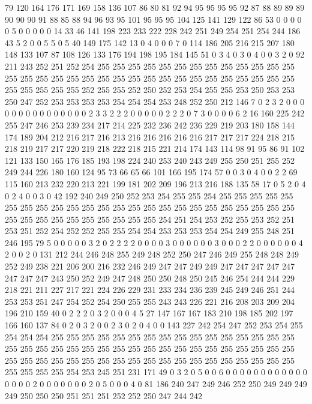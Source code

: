 79 120 164 176 171 169 158 136 107 86 80 81 92 94 95 95 95 95 92 87
88 89 89 89 90 90 90 91 88 85 88 94 96 93 95 101 95 95 95 104
125 141 129 122 86 53 0 0 0 0 0 5 0 0 0 0 0 14 33 46
141 198 223 233 222 228 242 251 249 254 251 254 244 186 43 5 2 0 0 5
5 0 5 40 149 175 142 13 0 4 0 0 0 7 0 114 186 205 216 215
207 180 148 133 107 87 108 126 133 176 194 198 195 184 145 51 0 3 4 0
3 0 4 0 0 3 2 0 92 211 243 252 251 252 254 255 255 255 255 255
255 255 255 255 255 255 255 255 255 255 255 255 255 255 255 255 255 255 255 255
255 255 255 255 255 255 255 255 255 255 255 255 252 255 255 252 250 252 253 254
255 255 253 250 253 253 250 247 252 253 253 253 253 254 254 254 253 248 252 250
212 146 7 0 2 3 2 0 0 0 0 0 0 0 0 0 0 0 0 0
0 0 2 3 3 2 2 2 0 0 0 0 0 2 2 2 0 7 3 0
0 0 0 6 2 16 160 225 242 255 247 246 253 239 234 217 214 225 232 236
242 236 229 219 203 180 158 144 174 189 204 212 216 217 216 213 216 216 216 216
216 217 217 217 224 218 215 218 219 217 217 220 219 218 222 218 215 221 214 174
143 114 98 91 95 86 91 102 121 133 150 165 176 185 193 198 224 240 253 240
243 249 255 250 251 255 252 249 244 226 180 160 124 95 73 66 65 66 101 166
195 174 57 0 0 3 0 4 0 0 2 2 69 115 160 213 232 220 213 221
199 181 202 209 196 213 216 188 135 58 17 0 5 2 0 4 0 2 4 0
0 3 0 42 192 240 249 250 252 253 254 255 255 254 255 255 255 255 255 255
255 255 255 255 255 255 255 255 255 255 255 255 255 255 255 255 255 255 255 255
255 255 255 255 255 255 255 255 254 251 254 253 252 255 253 252 251 253 251 252
254 252 252 255 255 254 254 253 253 253 254 254 249 255 248 251 246 195 79 5
0 0 0 0 0 3 2 0 2 2 2 2 0 0 0 0 3 0 0 0
0 0 0 3 0 0 0 2 2 0 0 0 0 0 0 4 2 0 0 2
0 131 212 244 246 248 255 249 248 252 250 247 246 249 255 248 248 249 252 249
238 221 206 200 216 232 246 249 247 247 249 249 247 247 247 247 247 247 247 247
243 250 252 249 247 248 250 250 248 250 245 246 254 244 244 229 218 221 211 227
217 221 224 226 229 231 233 234 236 239 245 249 246 251 244 253 253 251 247 254
252 254 250 255 255 243 243 226 221 216 208 203 209 204 196 210 159 40 0 2
2 2 0 3 2 0 0 0 4 5 27 147 167 167 183 210 198 185 202 197
166 160 137 84 0 2 0 3 2 0 0 2 3 0 2 0 4 0 0 143
227 242 254 247 252 253 254 255 254 254 254 255 255 255 255 255 255 255 255 255
255 255 255 255 255 255 255 255 255 255 255 255 255 255 255 255 255 255 255 255
255 255 255 255 255 255 255 255 255 255 255 255 255 255 255 255 255 255 255 255
255 255 255 255 255 255 255 255 255 254 253 245 251 231 171 49 0 3 2 0
5 0 0 6 0 0 0 0 0 0 0 0 0 0 0 0 0 0 0 0
2 0 0 0 0 0 0 0 2 0 5 0 0 0 4 0 81 186 240 247
249 246 252 250 249 249 249 249 250 250 250 251 251 251 252 252 250 247 244 242
